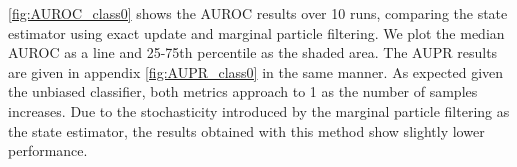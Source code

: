 \autoref{fig:AUROC_class0} shows the AUROC results over 10 runs, comparing the state estimator using exact update and marginal particle filtering. We plot the median AUROC as a line and 25-75th percentile as the shaded area. The AUPR results are given in appendix \autoref{fig:AUPR_class0} in the same manner. As expected given the unbiased classifier, both metrics approach to 1 as the number of samples increases. Due to the stochasticity introduced by the marginal particle filtering as the state estimator, the results obtained with this method show slightly lower performance. 
